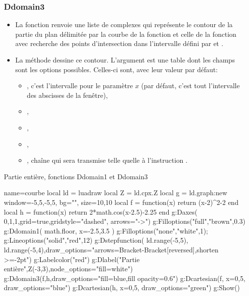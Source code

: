 \subsubsection{Ddomain3}

\begin{itemize}
    \item La fonction  renvoie une liste de complexes qui représente le contour de la partie du plan délimitée par la courbe de la fonction  et celle de la fonction  avec recherche des points d'intersection dans l'intervalle défini par  et .
 
    \item La méthode  dessine ce contour. L'argument  est une table dont les champs sont les options possibles. Celles-ci sont, avec leur valeur par défaut:
  \begin{itemize}
      \item {}, c'est l'intervalle pour le paramètre $x$ (par défaut, c'est tout l'intervalle des abscisses de la fenêtre), 
      \item {}, 
      \item {},
      \item {},
      \item {}, chaîne qui sera transmise telle quelle à l'instruction \drawcmd.
  \end{itemize}
\end{itemize}

\begin{demo}{Partie entière, fonctions Ddomain1 et Ddomain3}
\begin{luadraw}{name=courbe}
local ld = luadraw
local Z = ld.cpx.Z
local g = ld.graph:new{ window={-5,5,-5,5}, bg="", size={10,10} }
local f = function(x) return (x-2)^2-2 end
local h = function(x) return 2*math.cos(x-2.5)-2.25 end
g:Daxes( {0,1,1},{grid=true,gridstyle="dashed", arrows="->"})
g:Filloptions("full","brown",0.3)
g:Ddomain1( math.floor, { x={-2.5,3.5} })
g:Filloptions("none","white",1); g:Lineoptions("solid","red",12)
g:Dstepfunction( {ld.range(-5,5), ld.range(-5,4)},{draw_options="arrows={Bracket-Bracket[reversed]},shorten >=-2pt"})
g:Labelcolor("red")
g:Dlabel("Partie entière",Z(-3,3),{node_options="fill=white"})
g:Ddomain3(f,h,{draw_options="fill=blue,fill opacity=0.6"})
g:Dcartesian(f, {x={0,5}, draw_options="blue"})
g:Dcartesian(h, {x={0,5}, draw_options="green"})
g:Show()
\end{luadraw}
\end{demo}

